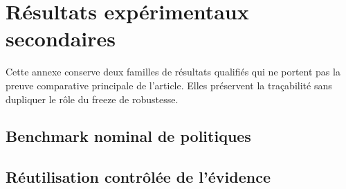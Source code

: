 \section{Résultats expérimentaux secondaires}
\label{sec:v3-supplement}

Cette annexe conserve deux familles de résultats qualifiés qui ne portent pas
la preuve comparative principale de l'article. Elles préservent la
traçabilité sans dupliquer le rôle du freeze de robustesse.

\subsection{Benchmark nominal de politiques}


\subsection{Réutilisation contrôlée de l'évidence}

